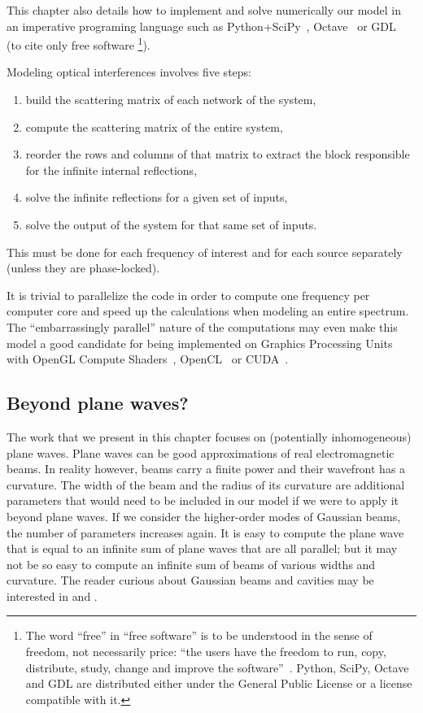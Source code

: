 \begin{refsection}
This chapter also details how to implement and solve numerically our model in an imperative programing language such as Python+SciPy~\parencite{python,scipy}, Octave~\parencite{octave:2014} or GDL~\parencite{gnudatalanguage}
(to cite only free software%
\footnote{
   The word ``free'' in ``free software'' is to be understood in the sense of freedom, not necessarily price: ``the users have the freedom to run, copy, distribute, study, change and improve the software''~\parencite{gplv3}.
   Python, SciPy, Octave and GDL are distributed either under the General Public License or a license compatible with it.
}).

Modeling optical interferences involves five steps:
\begin{enumerate}
    \item build the scattering matrix of each network of the system,
    \item compute the scattering matrix of the entire system,
    \item reorder the rows and columns of that matrix to extract the block responsible for the infinite internal reflections,
    \item solve the infinite reflections for a given set of inputs,
    \item solve the output of the system for that same set of inputs.
\end{enumerate}
This must be done for each frequency of interest and for each source separately (unless they are phase-locked).

It is trivial to parallelize the code in order to compute one frequency per computer core and speed up the calculations when modeling an entire spectrum.
The ``embarrassingly parallel'' nature of the computations may even make this model a good candidate for being implemented on Graphics Processing Units
with OpenGL Compute Shaders~\parencite{opengl44},
OpenCL~\parencite{opencl2}
or CUDA~\parencite{cuda}.



\subsection{Beyond plane waves?}
The work that we present in this chapter focuses on (potentially inhomogeneous) plane waves.
Plane waves can be good approximations of real electromagnetic beams.
In reality however, beams carry a finite power and their wavefront has a curvature.
The width of the beam and the radius of its curvature are additional parameters that would need to be included in our model if we were to apply it beyond plane waves.
If we consider the higher-order modes of Gaussian beams, the number of parameters increases again.
It is easy to compute the plane wave that is equal to an infinite sum of plane waves that are all parallel;
but it may not be so easy to compute an infinite sum of beams of various widths and curvature.
The reader curious about Gaussian beams and cavities may be interested in
\textcite{goldsmith1998quasioptical}
and
\textcite{siegman1986lasers}.


\end{refsection}
